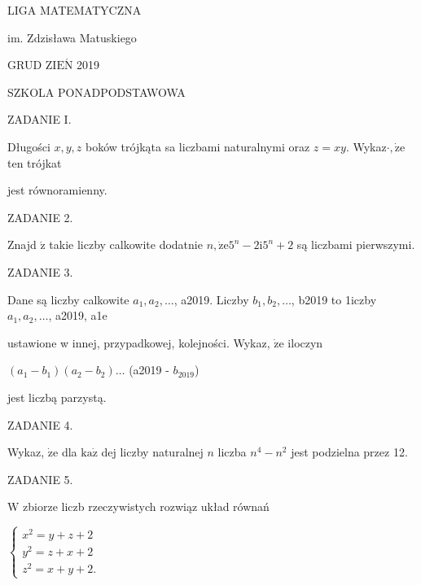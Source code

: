 \documentclass[a4paper,12pt]{article}
\begin{document}
LIGA MATEMATYCZNA

im. Zdzisława Matuskiego

GRUD Z$\mathrm{I}\mathrm{E}\acute{\mathrm{N}}$ 2019

SZKOLA PONADPODSTAWOWA

ZADANIE I.

Długości $x, y, z$ boków trójkąta sa liczbami naturalnymi oraz $z=xy$. Wykaz$\cdot, \dot{\mathrm{z}}\mathrm{e}$ ten trójkat

jest równoramienny.

ZADANIE 2.

Znajd $\acute{\mathrm{z}}$ takie liczby calkowite dodatnie $n, \dot{\mathrm{z}}\mathrm{e}5^{n}-2\mathrm{i}5^{n}+2$ są liczbami pierwszymi.

ZADANIE 3.

Dane są liczby calkowite $a_{1}, a_{2}, \ldots$, a2019. Liczby $b_{1}, b_{2}, \ldots$, b2019 to 1iczby $a_{1}, a_{2}, \ldots$, a2019, a1e

ustawione w innej, przypadkowej, kolejności. Wykaz, $\dot{\mathrm{z}}\mathrm{e}$ iloczyn

$(a_{1}-b_{1})(a_{2}-b_{2})\ldots$ (a2019 - $b_{2019}$)

jest liczbą parzystą.

ZADANIE 4.

Wykaz, $\dot{\mathrm{z}}\mathrm{e}$ dla $\mathrm{k}\mathrm{a}\dot{\mathrm{z}}$ dej liczby naturalnej $n$ liczba $n^{4}-n^{2}$ jest podzielna przez 12.

ZADANIE 5.

$\mathrm{W}$ zbiorze liczb rzeczywistych rozwiąz układ równań

$\left\{\begin{array}{l}
x^{2}=y+z+2\\
y^{2}=z+x+2\\
z^{2}=x+y+2.
\end{array}\right.$
\end{document}
